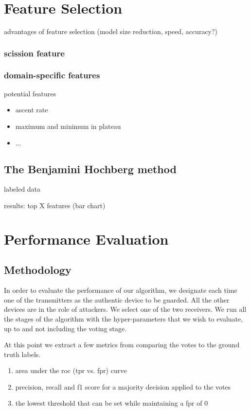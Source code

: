 \documentclass[conference]{IEEEtran}
\begin{document}
\section{Feature Selection}

  \color{gray}
  advantages of feature selection (model size reduction, speed, accuracy?)
  \color{black}


\subsubsection{scission feature}

\cite{kneib2018scission}

\subsubsection{domain-specific features}
  potential features
  \begin{itemize}
    \item ascent rate
    \item maximum and minimum in plateau
    \item ...
  \end{itemize}
 
 \subsection{The Benjamini Hochberg method}
 
 \cite{benjamini1995controlling}
 
  labeled data
 
  results: top X features  (bar chart)

\section{Performance Evaluation}

\subsection{Methodology}
  In order to evaluate the performance of our algorithm, we designate each time one of the transmitters as the authentic device to be guarded. All the other devices are in the role of attackers. We select one of the two receivers. We run all the stages of the algorithm with the hyper-parameters that we wish to evaluate, up to and not including the voting stage.
  
  At this point we extract a few metrics from comparing the votes to the ground truth labels.
  \begin{enumerate}
    \item area under the roc (tpr vs. fpr) curve
    \item precision, recall and f1 score for a majority decision applied to the votes
    \item the lowest threshold that can be set while maintaining a fpr of 0
  \end{enumerate}
  
\end{document}
